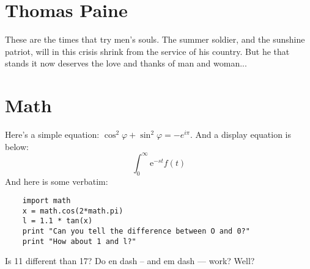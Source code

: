 \documentclass[12pt,letterpaper]{scrartcl}
\newcommand{\laplace}{$$\int_0^\infty \mathup  e^{-st}f(t)$$}
\begin{document}
\section{Thomas Paine}
    
    These are the times that try men's souls. The summer soldier, and the sunshine patriot, will in this crisis shrink from the service of his country. But he that stands it now deserves the love and thanks of man and woman...

% 

\section{Math}

Here's a simple equation: $\cos^2 \varphi + \sin^2 \varphi = -e^{i\pi}$. And a display equation is below:
    \laplace
And here is some verbatim:
\begin{lstlisting}
    import math
    x = math.cos(2*math.pi)
    l = 1.1 * tan(x)
    print "Can you tell the difference between O and 0?"
    print "How about 1 and l?"
\end{lstlisting}  

Is 11 different than 17? Do en dash -- and em dash --- work? Well?

    
\end{document}
